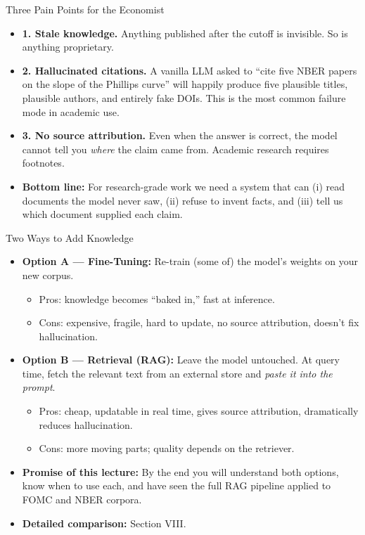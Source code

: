 \documentclass[10pt,english,aspectratio=169]{beamer}
\begin{document}
\begin{frame}{Three Pain Points for the Economist}
\begin{itemize}
\item \textbf{1. Stale knowledge.} Anything published after the cutoff is invisible. So is anything proprietary.

\medskip
\item \textbf{2. Hallucinated citations.} A vanilla LLM asked to ``cite five NBER papers on the slope of the Phillips curve'' will happily produce five plausible titles, plausible authors, and entirely fake DOIs. This is the most common failure mode in academic use.

\medskip
\item \textbf{3. No source attribution.} Even when the answer is correct, the model cannot tell you \emph{where} the claim came from. Academic research requires footnotes.

\medskip
\item \textbf{Bottom line:} For research-grade work we need a system that can (i) read documents the model never saw, (ii) refuse to invent facts, and (iii) tell us which document supplied each claim.
\end{itemize}
\end{frame}

\begin{frame}{Two Ways to Add Knowledge}
\begin{itemize}
\item \textbf{Option A --- Fine-Tuning:} Re-train (some of) the model's weights on your new corpus.
\begin{itemize}
    \item Pros: knowledge becomes ``baked in,'' fast at inference.
    \item Cons: expensive, fragile, hard to update, no source attribution, doesn't fix hallucination.
\end{itemize}

\medskip
\item \textbf{Option B --- Retrieval (RAG):} Leave the model untouched. At query time, fetch the relevant text from an external store and \emph{paste it into the prompt}.
\begin{itemize}
    \item Pros: cheap, updatable in real time, gives source attribution, dramatically reduces hallucination.
    \item Cons: more moving parts; quality depends on the retriever.
\end{itemize}

\medskip
\item \textbf{Promise of this lecture:} By the end you will understand both options, know when to use each, and have seen the full RAG pipeline applied to FOMC and NBER corpora.

\medskip
\item \textbf{Detailed comparison:} Section VIII.
\end{itemize}
\end{frame}
\end{document}
